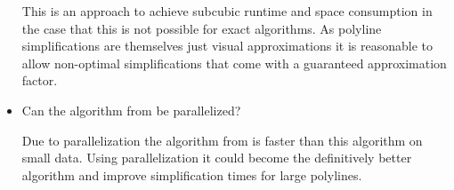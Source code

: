\begin{itemize}
	This is an approach to achieve subcubic runtime and space consumption in the case that this is not possible for exact algorithms. As polyline simplifications are themselves just visual approximations it is reasonable to allow non-optimal simplifications that come with a guaranteed approximation factor.

	\item Can the algorithm from \citeauthor{polyline_simplification_has_cubic_complexity_bringmannetal} be parallelized?

	Due to parallelization the algorithm from \citeauthor{on_optimal_polyline_simplification_using_the_hausdorff_and_frechet_distance} is faster than this algorithm on small data. Using parallelization it could become the definitively better algorithm and improve simplification times for large polylines.
\end{itemize}


